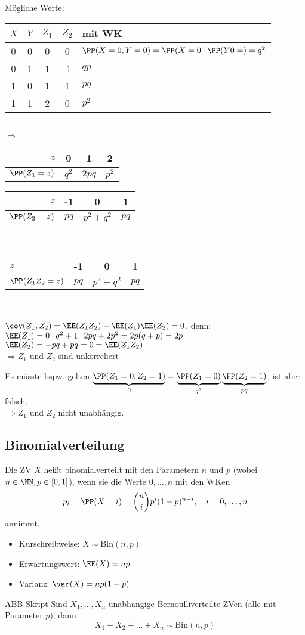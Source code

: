 \begin{anumerate}
\item Mögliche Werte:\\
\begin{tabular}{c c | c c | l}
$X$ & $Y$ & $Z_1$ & $Z_2$ & mit WK\\\hline
0 & 0 & 0 & 0 & $\PP(X=0,Y=0)=\PP(X=0\cdot \PP(Y0=) = q^2$\\
0 & 1 & 1 & -1 & $qp$\\
1 & 0 & 1 & 1 & $pq$\\
1 & 1 & 2 & 0 & $p^2$
\end{tabular}\\
$\Rightarrow$ \begin{tabular}{r | c c c}
$z$ & 0 & 1 & 2\\\hline
$\PP(Z_1=z)$ & $q^2$ & $2pq$ & $p^2$
\end{tabular} \quad \begin{tabular}{r | c c c}
$z$ & -1 & 0 & 1\\\hline
$\PP(Z_2=z)$ & $pq$ & $p^2+q^2$ & $pq$
\end{tabular}\\
\begin{tabular}{l | c c c }
$z$ & -1 &  0 & 1\\\hline
$\PP(Z_1Z_2=z)$ & $pq$ & $p^2+q^2$ & $pq$
\end{tabular}\\
\item $\cov (Z_1,Z_2)=\EE(Z_1Z_2)-\EE(Z_1) \EE(Z_2) = 0$, denn: \\
$\EE(Z_1)=0\cdot q^2 + 1 \cdot 2 pq + 2 p^2 = 2p(q+p) = 2p$\\
$\EE(Z_2)=-pq+pq = 0 =\EE(Z_1Z_2)$\\
$\Rightarrow Z_1$ und $Z_2$ sind unkorreliert
\item Es müsste bspw. gelten $\underbrace{\PP(Z_1=0, Z_2=1)}_{0}=\underbrace{\PP(Z_1=0)}_{q^2} \underbrace{\PP(Z_2=1)}_{pq}$, ist aber falsch.\\
$\Rightarrow Z_1$ und $Z_2$ nicht unabhängig.
\end{anumerate}
\subsection{Binomialverteilung}
 Die ZV $X$ heißt binomialverteilt mit den Parametern $n$ und $p$ (wobei $n \in \NN, p\in [0,1]$), wenn sie die Werte $0,\dots, n$ mit den WKen
$$p_i=\PP(X=i)=\binom{n}{i}p^i (1-p)^{n-i}, \quad i=0,\dots ,n$$
annimmt.
\begin{itemize}
\item Kurschreibweise: $X \sim \mathrm{Bin}(n,p)$
\item Erwartungswert: $\EE(X)=np$
\item Varianz: $\var (X) = np (1-p)$
\end{itemize}
ABB Skript
 Sind $X_1, \dots , X_n$ unabhängige Bernoulliverteilte ZVen (alle mit Parameter $p$), dann 
$$X_1+X_2+\dots + X_n \sim \mathrm{Bin}(n,p)$$

